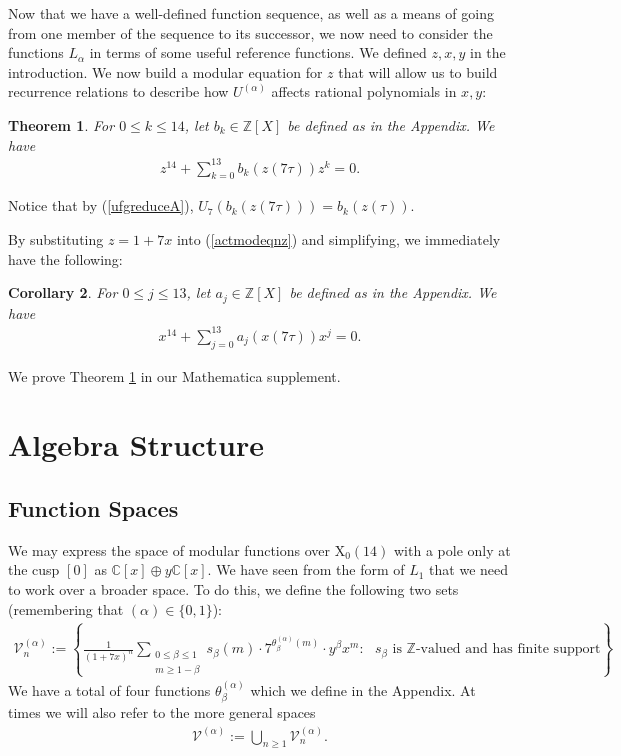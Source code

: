 \documentclass[reqno]{amsart}
\newtheorem{theorem}{Theorem}[section]
\newtheorem{corollary}[theorem]{Corollary}
\theoremstyle{definition}
\theoremstyle{remark}
\numberwithin{equation}{section}
\begin{document}
Now that we have a well-defined function sequence, as well as a means of going from one member of the sequence to its successor, we now need to consider the functions $L_{\alpha}$ in terms of some useful reference functions.  We defined $z, x, y$ in the introduction.  We now build a modular equation for $z$ that will allow us to build recurrence relations to describe how $U^{(\alpha)}$ affects rational polynomials in $x, y$:

\begin{theorem}\label{modeqnz}
For $0\le k\le 14$, let $b_k\in\mathbb{Z}[X]$ be defined as in the Appendix.  We have
\begin{align}
z^{14}+\sum_{k=0}^{13}b_k(z(7\tau))z^k=0.\label{actmodeqnz}
\end{align}
\end{theorem}  Notice that by (\ref{ufgreduceA}), $U_{7}\left( b_k(z(7\tau)) \right)=b_k(z(\tau))$.

By substituting $z=1+7x$ into (\ref{actmodeqnz}) and simplifying, we immediately have the following:

\begin{corollary}\label{cor1}
For $0\le j\le 13$, let $a_j\in\mathbb{Z}[X]$ be defined as in the Appendix.  We have
\begin{align}
x^{14}+\sum_{j=0}^{13}a_j(x(7\tau))x^j=0.\label{modeqnx}
\end{align}
\end{corollary}

We prove Theorem \ref{modeqnz} in our Mathematica supplement.

\section{Algebra Structure}\label{sectionalgebra}

\subsection{Function Spaces}

We may express the space of modular functions over $\mathrm{X}_0(14)$ with a pole only at the cusp $[0]$ as $\mathbb{C}[x]\oplus y\mathbb{C}[x]$.  We have seen from the form of $L_1$ that we need to work over a broader space.  To do this, we define the following two sets (remembering that $(\alpha)\in\{0,1\}$):  
\begin{align*}
\mathcal{V}^{(\alpha)}_{n} := \left\{ \frac{1}{(1+7x)^n}\sum_{\substack{0\le\beta\le 1\\ m\ge 1-\beta}} s_{\beta}(m)\cdot 7^{\theta^{(\alpha)}_{\beta}(m)}\cdot y^{\beta}x^m: \text{ $s_{\beta}$ is $\mathbb{Z}$-valued and has finite support} \right\}.
\end{align*}  We have a total of four functions $\theta^{(\alpha)}_{\beta}$ which we define in the Appendix.  At times we will also refer to the more general spaces
\begin{align*}
\mathcal{V}^{(\alpha)} := \bigcup_{n\ge 1} \mathcal{V}^{(\alpha)}_{n}.
\end{align*}
\end{document}
